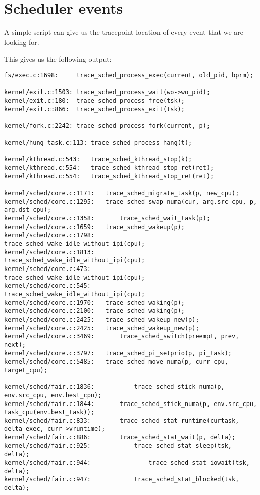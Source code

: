 \chapter{Scheduler events}
\label{ch:events_documentation}
A simple script can give us the tracepoint location of every event that we are looking for.
This gives us the following output:
\begin{Verbatim}[xleftmargin=-2cm,fontsize=\footnotesize]
fs/exec.c:1698:		trace_sched_process_exec(current, old_pid, bprm);

kernel/exit.c:1503:	trace_sched_process_wait(wo->wo_pid);
kernel/exit.c:180:	trace_sched_process_free(tsk);
kernel/exit.c:866:	trace_sched_process_exit(tsk);

kernel/fork.c:2242:	trace_sched_process_fork(current, p);

kernel/hung_task.c:113:	trace_sched_process_hang(t);

kernel/kthread.c:543:	trace_sched_kthread_stop(k);
kernel/kthread.c:554:	trace_sched_kthread_stop_ret(ret);
kernel/kthread.c:554:	trace_sched_kthread_stop_ret(ret);

kernel/sched/core.c:1171:	trace_sched_migrate_task(p, new_cpu);
kernel/sched/core.c:1295:	trace_sched_swap_numa(cur, arg.src_cpu, p, arg.dst_cpu);
kernel/sched/core.c:1358:		trace_sched_wait_task(p);
kernel/sched/core.c:1659:	trace_sched_wakeup(p);
kernel/sched/core.c:1798:			trace_sched_wake_idle_without_ipi(cpu);
kernel/sched/core.c:1813:		trace_sched_wake_idle_without_ipi(cpu);
kernel/sched/core.c:473:		trace_sched_wake_idle_without_ipi(cpu);
kernel/sched/core.c:545:		trace_sched_wake_idle_without_ipi(cpu);
kernel/sched/core.c:1970:	trace_sched_waking(p);
kernel/sched/core.c:2100:	trace_sched_waking(p);
kernel/sched/core.c:2425:	trace_sched_wakeup_new(p);
kernel/sched/core.c:2425:	trace_sched_wakeup_new(p);
kernel/sched/core.c:3469:		trace_sched_switch(preempt, prev, next);
kernel/sched/core.c:3797:	trace_sched_pi_setprio(p, pi_task);
kernel/sched/core.c:5485:	trace_sched_move_numa(p, curr_cpu, target_cpu);

kernel/sched/fair.c:1836:			trace_sched_stick_numa(p, env.src_cpu, env.best_cpu);
kernel/sched/fair.c:1844:		trace_sched_stick_numa(p, env.src_cpu, task_cpu(env.best_task));
kernel/sched/fair.c:833:		trace_sched_stat_runtime(curtask, delta_exec, curr->vruntime);
kernel/sched/fair.c:886:		trace_sched_stat_wait(p, delta);
kernel/sched/fair.c:925:			trace_sched_stat_sleep(tsk, delta);
kernel/sched/fair.c:944:				trace_sched_stat_iowait(tsk, delta);
kernel/sched/fair.c:947:			trace_sched_stat_blocked(tsk, delta);
\end{Verbatim}

